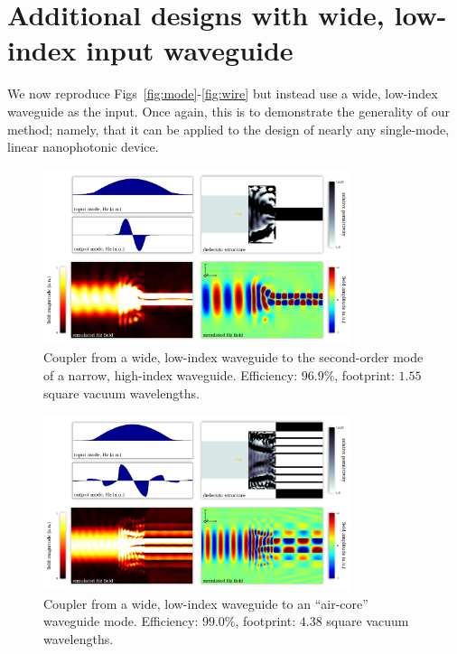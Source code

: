 \section{Additional designs with wide, low-index input waveguide}
We now reproduce Figs~\ref{fig:mode}-\ref{fig:wire}
    but instead use a wide, low-index waveguide as the input.
Once again, this is to demonstrate the generality of our method;
    namely, that it can be applied to the design of nearly any
    single-mode, linear nanophotonic device.
\begin{figure}[h!]
    \centering
    \includegraphics[width=0.8\textwidth]{p3/12}
    \caption{
        Coupler from a wide, low-index waveguide to the
            second-order mode of a narrow, high-index waveguide.
        Efficiency: $96.9\%$,
        footprint: $1.55$ square vacuum wavelengths.
        }
\end{figure}
\begin{figure}[h!]
    \centering
    \includegraphics[width=0.8\textwidth]{p3/13}
    \caption{
        Coupler from a wide, low-index waveguide to an 
            ``air-core'' waveguide mode.
        Efficiency: $99.0\%$,
        footprint: $4.38$ square vacuum wavelengths.
        }
\end{figure}
